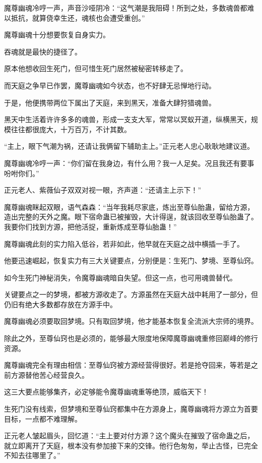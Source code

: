 \begin{this_body}
魔尊幽魂冷哼一声，声音沙哑阴冷：“这气潮是我阻碍！所到之处，多数魂兽都难以抵抗，就算侥幸生还，魂核也会遭受重创。”

魔尊幽魂十分想要恢复自身实力。

吞魂就是最快的捷径了。

原本他想收回生死门，但可惜生死门居然被秘密转移走了。

而天庭之争早已作罢，魔尊幽魂如今状态，也不好肆无忌惮地行动。

于是，他便携带两位下属出了天庭，来到黑天，准备大肆狩猎魂兽。

黑天中生活着许许多多的魂兽，形成一支支大军，常常以冥蚁开道，纵横黑天，规模往往都很庞大，十万百万，不计其数。

“主上，眼下气潮为祸，还请让我俩留下辅助主上。”正元老人忠心耿耿地建议道。

魔尊幽魂冷哼一声：“你们留在我身边，有什么用？我一人足矣。况且我还有要事吩咐你们。”

正元老人、紫薇仙子双双对视一眼，齐声道：“还请主上示下！”

魔尊幽魂眯起双眼，语气森森：“当年我耗尽家底，炼出至尊仙胎蛊，留给方源，造出完整的天外之魔。眼下宿命蛊已被摧毁，大计得逞，就该回收至尊仙胎蛊了。我要你们找到方源，把他活捉，重新炼成至尊仙胎蛊！”

魔尊幽魂此刻的实力陷入低谷，若非如此，他早就在天庭之战中横插一手了。

他要迅速崛起，恢复实力有三大关键要点，分别便是：生死门、梦境、至尊仙窍。

如今生死门神秘消失，令魔尊幽魂暗自失望。但这一点，也可用魂兽替代。

关键要点之一的梦境，都被方源收走了。方源虽然在天庭大战中耗用了一部分，但仍旧有绝大多数都存放在方源手中。

魔尊幽魂必须要取回梦境。只有取回梦境，他才能基本恢复全流派大宗师的境界。

除此之外，至尊仙窍也是必须的，能够最大限度地保障魔尊幽魂重修回巅峰的修行资源。

魔尊幽魂完全有理由相信：至尊仙窍被方源经营得很好。若是抢夺回来，等若是之前方源替他苦心经营良久。

这三大要点能够集齐，必定够能令魔尊幽魂重等绝顶，威临天下！

生死门没有线索，但梦境和至尊仙窍都集中在方源身上，魔尊幽魂将方源立为首要目标，一点都不难理解。

正元老人皱起眉头，回忆道：“主上要对付方源？这个魔头在摧毁了宿命蛊之后，就立即离开了天庭，根本没有参加接下来的交锋。他行色匆匆，举止古怪，已完全不知去往哪里了。”


\end{this_body}
